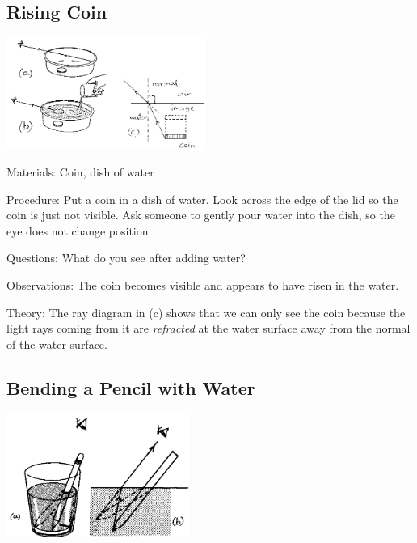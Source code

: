 \begin{multicols}{2}
\subsection{Rising Coin}

\begin{center}
\includegraphics[width=0.49\textwidth]{./img/source/rising-coin.png}
\end{center}

\begin{description*}
\item[Materials:]{Coin, dish of water}
\item[Procedure:]{Put a coin in a dish of water. Look across the edge of the lid so the coin is just not visible. Ask someone to gently pour water into the dish, so the eye does not change position.}
\item[Questions:]{What do you see after adding water?}
\item[Observations:]{The coin becomes visible and appears to have risen in the water.}
\item[Theory:]{The ray diagram in (c) shows that we can only see the coin because the light rays coming from it are \emph{refracted} at the water surface away from the normal of the water surface.}
\end{description*}

\subsection{Bending a Pencil with Water}

\begin{center}
\includegraphics[width=0.45\textwidth]{./img/source/bending-pencil.png}
\end{center}


\end{multicols}
